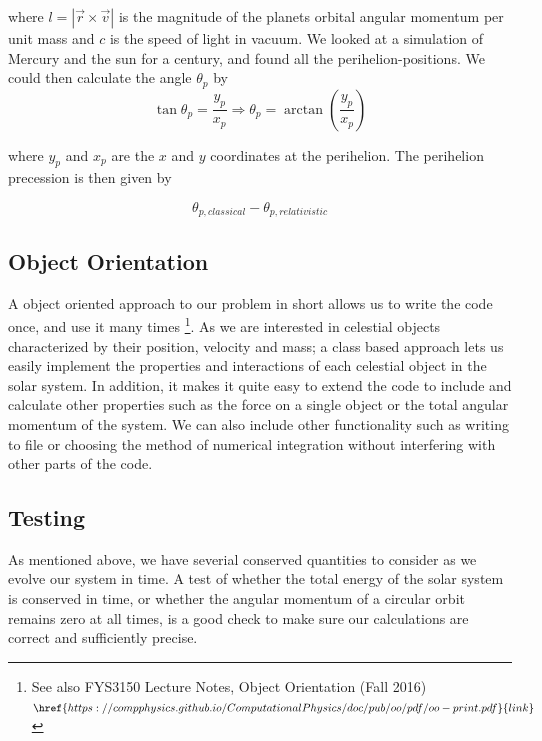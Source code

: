 \documentclass[%
 reprint,
 nobalance,
 amsmath,amssymb,
 aps,
]{revtex4-1}
\begin{document}
where $l = |\vec{r} \times \vec{v}|$ is the magnitude of the planets orbital angular momentum per unit mass and $c$ is the speed of light in vacuum. We looked at a simulation of Mercury and the sun for a century, and found all the perihelion-positions. We could then calculate the angle $\theta_p$ by 
\begin{equation}\label{eq:per_prec}
\tan \theta_p = \frac{y_p}{x_p} \Rightarrow \theta_p = \arctan(\frac{y_p}{x_p})
\end{equation}

where $y_p$ and $x_p$ are the $x$ and $y$ coordinates at the perihelion. The perihelion precession is then given by

\begin{equation}\label{eq:per_prec2}
\theta_{p, classical} - \theta_{p, relativistic}
\end{equation}



\subsection{Object Orientation}
A object oriented approach to our problem in short allows us to write the code once, and use it many times \footnote{See also FYS3150 Lecture Notes, Object Orientation (Fall 2016) $\href{https://compphysics.github.io/ComputationalPhysics/doc/pub/oo/pdf/oo-print.pdf}{link}$}.
As we are interested in celestial objects characterized by their position, velocity and mass; a class based approach lets us easily implement the properties and interactions of each celestial object in the solar system. In addition, it makes it quite easy to extend the code to include and calculate other properties such as the force on a single object or the total angular momentum of the system. We can also include other functionality such as writing to file or choosing the method of numerical integration without interfering with other parts of the code.


\subsection{\label{sec:Uni}Testing}
As mentioned above, we have severial conserved quantities to consider as we evolve our system in time. A test of whether the total energy of the solar system is conserved in time, or whether the angular momentum of a circular orbit remains zero at all times, is a good check to make sure our calculations are correct and sufficiently precise.
\end{document}
